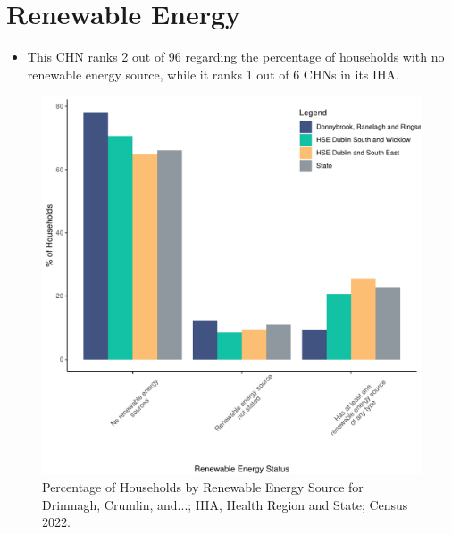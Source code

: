 \documentclass{article}
\begin{document}
\section{Renewable Energy}\label{sect:RE}
\begin{itemize}
\item This CHN ranks  2 out of 96 regarding the percentage of households with no renewable energy source, while it ranks   1 out of 6 CHNs in its IHA.
\end{itemize}
\begin{figure}[H]
	\centering
	\includegraphics[width = 140mm]{../figures/RenewableEnergyED.pdf}
	\caption{Percentage of Households by Renewable Energy Source for Drimnagh, Crumlin, and...; IHA, Health Region and State; Census 2022.}
	\label{fig:vbnv}
	\end{figure}
\end{document}
